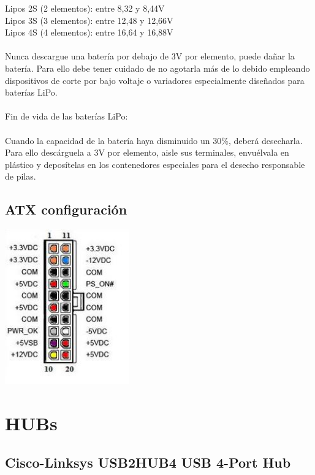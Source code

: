 \documentclass[a4paper,usenames,dvipsnames,svgnames,table]{book}
\begin{document}
    Lipos 2S (2 elementos): entre 8,32 y 8,44V\\
    Lipos 3S (3 elementos): entre 12,48 y 12,66V\\
    Lipos 4S (4 elementos): entre 16,64 y 16,88V\\
\\
Nunca descargue una batería por debajo de 3V por elemento, puede dañar la batería. Para ello debe tener cuidado de no 
agotarla más de lo debido empleando dispositivos de corte por bajo voltaje o variadores especialmente diseñados para 
baterías LiPo.\\
\\
Fin de vida de las baterías LiPo:\\
\\
Cuando la capacidad de la batería haya disminuido un 30\%, deberá desecharla. Para ello descárguela a 3V por elemento, 
aisle sus terminales, envuélvala en plástico y deposítelas en los contenedores especiales para el desecho responsable de 
pilas.\\

\subsection{ATX configuración}
\begin{center}
\includegraphics[width=0.4\textwidth]{Figures/Hardware/Partes/ATX.JPG}
\label{fig:Hardware:Partes:Microfono:ATX}
\end{center}

\section{HUBs}

\subsection{Cisco-Linksys USB2HUB4 USB 4-Port Hub}
\end{document}
